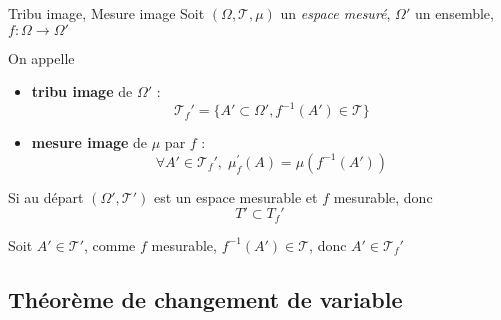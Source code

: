 \begin{Definition}[colbacktitle=red!75!black]{Tribu image, Mesure image}{}
Soit $(\Omega, \mathcal{T}, \mu)$ un \textit{espace mesuré}, $\Omega '$ un ensemble, $f : \Omega \to \Omega'$ 


On appelle 
\begin{itemize}

    \item \textbf{tribu image} de $\Omega'$ : 
      \begin{equation}
        \mathcal{T}_f ' =  \{ A' \subset \Omega', f ^{-1}(A') \in \mathcal{T}\}
      \end{equation}

    \item \textbf{mesure image} de $\mu$ par $f$ : 
      \begin{equation}
        \forall A' \in \mathcal{T}_f ', \; \mu_f ^{'}(A) = \mu (f ^{-1}(A'))
      \end{equation}

\end{itemize}
\end{Definition}

\begin{Prop}{}{}
Si au départ $(\Omega', \mathcal{T}')$ est un espace mesurable et $f$ mesurable, donc 
\begin{equation}
  T' \subset T_f'
\end{equation}
\end{Prop}

\begin{myproof}{}{}
Soit $A ' \in \mathcal{T}'$, comme $f$ mesurable, $f ^{-1}(A') \in \mathcal{T}$, donc $A' \in \mathcal{T}_f'$
\end{myproof}

\subsection{Théorème de changement de variable} %


